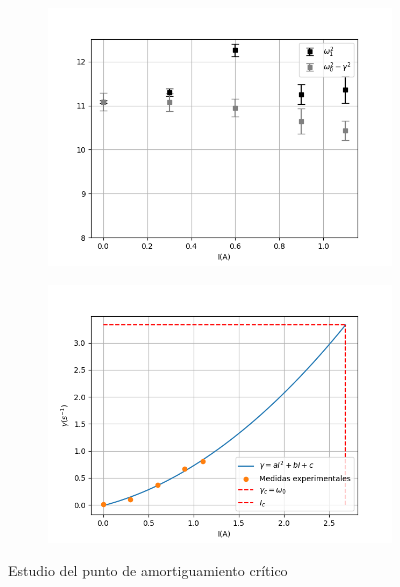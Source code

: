 \documentclass[a4paper,12pt,titlepage]{article}
\begin{document}
\begin{figure}[h!]
    \centering
    \begin{subfigure}{0.49\textwidth}
        \centering
        \includegraphics[width=0.95\linewidth]{Images/omega_cuadrado.png}
    \end{subfigure}
    \begin{subfigure}{0.49\textwidth}
        \centering
        \includegraphics[width=0.95\linewidth]{Images/gammaVSi.png}
    \end{subfigure}
    \caption{Estudio del punto de amortiguamiento crítico}
\end{figure}
\end{document}
